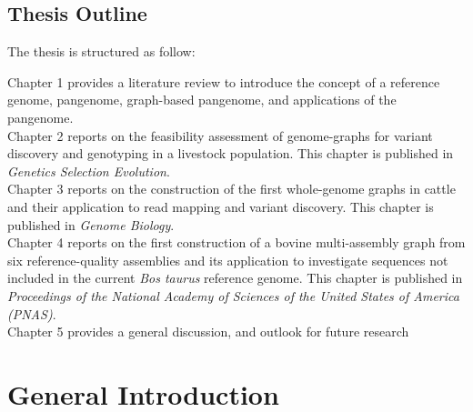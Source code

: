 \documentclass[11 pt, a4paper, notitlepage, twoside]{report}
\begin{document}
\newpage

{}
\section*{\LARGE{Thesis Outline}}
\thispagestyle{plain}

The thesis is structured as follow:

Chapter 1 provides a literature review to introduce the concept of a reference genome, pangenome, graph-based pangenome, and applications of the pangenome. \\

Chapter 2 reports on the feasibility assessment of genome-graphs for variant discovery and genotyping in a livestock population. This chapter is published in \emph{Genetics Selection Evolution}. \\ 

Chapter 3 reports on the construction of the first  whole-genome graphs in cattle and their application to read mapping and variant discovery. This chapter is published in \emph{Genome Biology}. \\

Chapter 4 reports on the first construction of a bovine multi-assembly graph from six reference-quality assemblies and its application to investigate sequences not included in the current \emph{Bos taurus} reference genome. This chapter is published in \emph{Proceedings of the National Academy of Sciences of the United States of America (PNAS)}. \\


Chapter 5 provides a general discussion, and outlook for future research


\iftwoside
\cleardoublepage
\newpage
\fi

\newpage



\pagestyle{main}



\onehalfspacing




\chapter[General Introduction]{\LARGE{General Introduction}}
\label{chap:intro}
\end{document}
